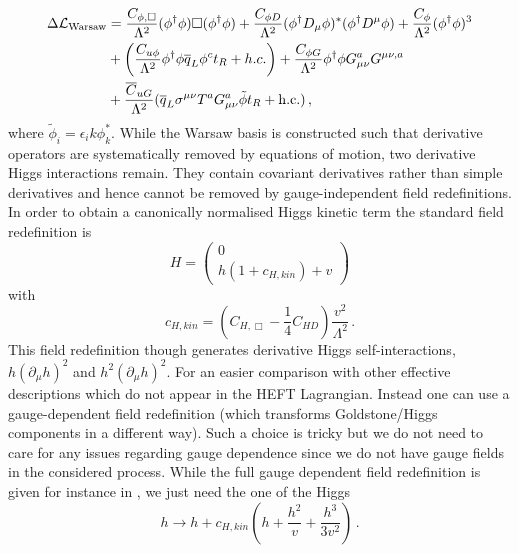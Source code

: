 \begin{equation}
	\begin{split}
		\Delta\mathcal{L}_{\text{Warsaw}}&=\frac{C_{\phi,\Box}}{\Lambda^2} (\phi^{\dagger} \phi)\Box (\phi^{\dagger } \phi)+ \frac{C_{\phi D}}{\Lambda^2}(\phi^{\dagger} D_{\mu}\phi)^*(\phi^{\dagger}D^{\mu}\phi)+ \frac{C_\phi}{\Lambda^2} (\phi^{\dagger}\phi)^3 \\ &+\left( \frac{C_{u\phi}}{\Lambda^2} \phi^{\dagger}{\phi}\bar{q}_L\phi^c t_R + h.c.\right)+\frac{C_{\phi G}}{\Lambda^2} \phi^{\dagger} \phi G_{\mu\nu}^a G^{\mu\nu,a} \\ &+\frac{\bar C_{uG}}{\Lambda^2} 
		(\bar q_L\sigma^{\mu\nu}T^aG_{\mu\nu}^a\tilde\phi t_R +{\rm h.c.})\,, \label{eq:warsaw}
	\end{split}
\end{equation}
where $\tilde\phi_i=\epsilon_ik \phi_k^*$.
While the Warsaw basis is constructed such that derivative operators are systematically removed by equations of motion, two derivative Higgs interactions remain. They contain covariant derivatives rather than simple derivatives and hence cannot be removed by gauge-independent field redefinitions. In order to obtain a canonically normalised Higgs kinetic term the standard field redefinition is 
\begin{equation}
	H=\left( \begin{array}{c} 0 \\ h(1+c_{H,kin}) + v \end{array} \right)
\end{equation} 
with 
\begin{equation}
	c_{H,kin}=\left(C_{H,\Box}-\frac{1}{4}C_{HD}\right) \frac{v^2}{\Lambda^2}\,.
\end{equation}
This field redefinition though generates derivative Higgs self-interactions, $h(\partial_{\mu}h)^2$ and $h^2(\partial_{\mu}h)^2$.
For an easier comparison with other effective descriptions which do not appear in the HEFT Lagrangian.  Instead one can use a gauge-dependent field redefinition (which transforms Goldstone/Higgs components in a different way). Such a choice is tricky but we do not need to care for any issues regarding gauge dependence since we do not have gauge fields in the considered process. While the full gauge dependent field redefinition is given for instance in \cite{Hartmann:2015aia}, we just need the one of the Higgs  
\begin{equation}
	h \to h + c_{H,kin}\left( h +\frac{h^2}{v}+\frac{h^3}{3v^2}\right)\,. \label{fieldref}
\end{equation}
